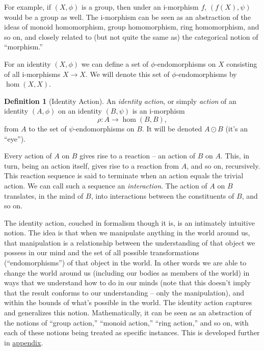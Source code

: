 \documentclass[pra,twocolumn,groupedaddress,10pt]{revtex4}
\theoremstyle{definition}
\newtheorem{defn}{Definition}[section]
\begin{document}
For example, if $(X, \phi)$ is a group, then under an i-morphism $f$, $(f(X), \psi)$ would be a group as well. The i-morphism can be seen as an abstraction of the ideas of monoid homomorphism, group homomorphism, ring homomorphism, and so on, and closely related to (but not quite the same as) the categorical notion of ``morphism.''

For an identity $(X, \phi)$ we can define a set of $\phi$-endomorphisms on $X$ consisting of all i-morphisms $X \rightarrow X$. We will denote this set of $\phi$-endomorphisms by $\hom(X, X)$.

\begin{defn}[Identity Action]
	An \emph{identity action}, or simply \emph{action} of an identity $(A, \phi)$ on an identity $(B, \psi)$ is an i-morphism
	\begin{equation}
		\rho : A \rightarrow \hom(B,B) ,
		\nonumber
	\end{equation}
	from $A$ to the set of $\psi$-endomorphisms on $B$. It will be denoted $A \odot B$ (it's an ``eye'').

	Every action of $A$ on $B$ gives rise to a reaction -- an action of $B$ on $A$. This, in turn, being an action itself, gives rise to a reaction from $A$, and so on, recursively. This reaction sequence is said to terminate when an action equals the trivial action. We can call such a sequence an \emph{interaction}. The action of $A$ on $B$ translates, in the mind of $B$, into interactions between the constituents of $B$, and so on.
\end{defn}

The identity action, couched in formalism though it is, is an intimately intuitive notion. The idea is that when we manipulate anything in the world around us, that manipulation is a relationship between the understanding of that object we possess in our mind and the set of all possible transformations (``endomorphisms'') of that object in the world. In other words we are able to change the world around us (including our bodies as members of the world) in ways that we understand how to do in our minds (note that this doesn't imply that the result conforms to our understanding -- only the manipulation), and within the bounds of what's possible in the world. The identity action captures and generalizes this notion. Mathematically, it can be seen as an abstraction of the notions of ``group action,'' ``monoid action,'' ``ring action,'' and so on, with each of these notions being treated as specific instances. This is developed further in \hyperref[app:algact]{appendix}.
\end{document}
